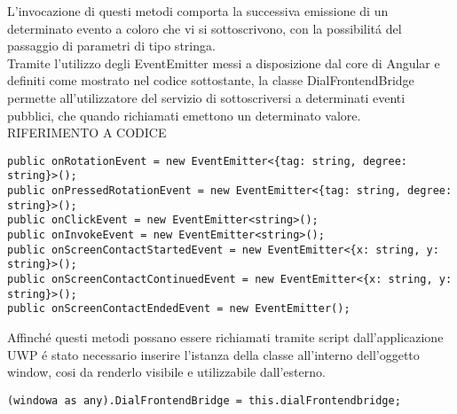 L'invocazione di questi metodi comporta la successiva emissione di un determinato evento a coloro che vi si sottoscrivono, con la possibilitá del passaggio di parametri di tipo stringa.\\

Tramite l'utilizzo degli EventEmitter messi a disposizione dal core di Angular e definiti come mostrato nel codice sottostante, la classe DialFrontendBridge permette all'utilizzatore del servizio di sottoscriversi a determinati eventi pubblici, che quando richiamati emettono un determinato valore. RIFERIMENTO A CODICE \\

\vspace{1.0cm}
\begin{lstlisting}[caption={EventEmitter esposti da DialFrontendBridge},style=javaScriptCode]
public onRotationEvent = new EventEmitter<{tag: string, degree: string}>();
public onPressedRotationEvent = new EventEmitter<{tag: string, degree: string}>();
public onClickEvent = new EventEmitter<string>();
public onInvokeEvent = new EventEmitter<string>();
public onScreenContactStartedEvent = new EventEmitter<{x: string, y: string}>();
public onScreenContactContinuedEvent = new EventEmitter<{x: string, y: string}>();
public onScreenContactEndedEvent = new EventEmitter();
\end{lstlisting} 
\vspace{1.0cm}

Affinché questi metodi possano essere richiamati tramite script dall'applicazione UWP é stato necessario inserire l'istanza della classe all'interno dell'oggetto window, cosi da renderlo visibile e utilizzabile dall'esterno.\\

\vspace{1.0cm}
\begin{lstlisting}[caption={Inserimento classe DialFrontendbridge in window },style=javaScriptCode]
(windowa as any).DialFrontendBridge = this.dialFrontendbridge;
\end{lstlisting} 
\vspace{1.0cm}

